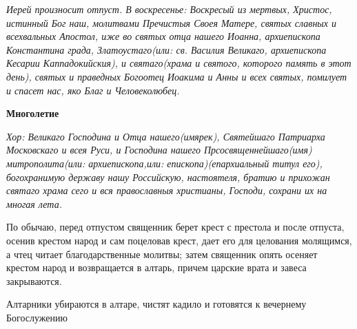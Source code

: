\itshape  Иерей произносит отпуст. В воскресенье:\normalfont{} Воскресый из мертвых, Христос, истинный Бог наш, молитвами Пречистыя Своея Матере, святых славных и всехвальных Апостол, иже во святых отца нашего Иоанна, архиепископа Константина града, Златоустаго\itshape  (или:\normalfont{} св. Василия Великаго, архиепископа Кесарии Каппадокийския), и святаго\itshape  (храма и святого, которого память в этот день),\normalfont{} святых и праведных Богоотец Иоакима и Анны и всех святых, помилует и спасет нас, яко Благ и Человеколюбец.


\medskip


 \bfseries  Многолетие \normalfont{}


\itshape  Хор:\normalfont{} Великаго Господина и Отца нашего\itshape  (имярек\normalfont{}), Святейшаго Патриарха Московскаго и всея Руси, и Господина нашего Прсосвященнейшаго\itshape  (имя)\normalfont{} митрополита\itshape  (или:\normalfont{} архиепископа,\itshape  или:\normalfont{} епископа)\itshape  (епархиальный титул его),\normalfont{} богохранимую державу нашу Российскую, настоятеля, братию и прихожан святаго храма сего и вся православныя христианы, Господи, сохрани их на многая лета.


\medskip


  По обычаю, перед отпустом священник берет крест с престола и после отпуста, осенив крестом народ и сам поцеловав крест, дает его для целования молящимся, а чтец читает благодарственные молитвы; затем священник опять осеняет крестом народ и возвращается в алтарь, причем царские врата и завеса закрываются.


  Алтарники убираются в алтаре, чистят кадило и готовятся к вечернему Богослужению


\mychapterending